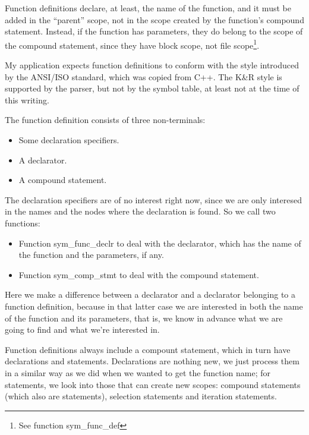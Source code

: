 \documentclass[a4paper,openany]{article}
\begin{document}
Function definitions declare, at least, the name of the function, and it must be added in the ``parent'' scope, not in the scope created by the function's compound statement. Instead, if the function has parameters, they do belong to the scope of the compound statement, since they have block scope, not file scope\footnote{See function sym\_func\_def}.

My application expects function definitions to conform with the style introduced by the ANSI/ISO standard, which was copied from C++. The K\&R style is supported by the parser, but not by the symbol table, at least not at the time of this writing.

The function definition consists of three non-terminals:

\begin{itemize}
\item Some declaration specifiers.

\item A declarator.

\item A compound statement.
\end{itemize}

The declaration specifiers are of no interest right now, since we are only interesed in the names and the nodes where the declaration is found. So we call two functions:

\begin{itemize}
\item Function sym\_func\_declr to deal with the declarator, which has the name of the function and the parameters, if any.

\item Function sym\_comp\_stmt to deal with the compound statement.
\end{itemize}

Here we make a difference between a declarator and a declarator belonging to a function definition, because in that latter case we are interested in both the name of the function and its parameters, that is, we know in advance what we are going to find and what we're interested in.

Function definitions always include a compount statement, which in turn have declarations and statements. Declarations are nothing new, we just process them in a similar way as we did when we wanted to get the function name; for statements, we look into those that can create new scopes: compound statements (which also are statements), selection statements and iteration statements.
\end{document}

